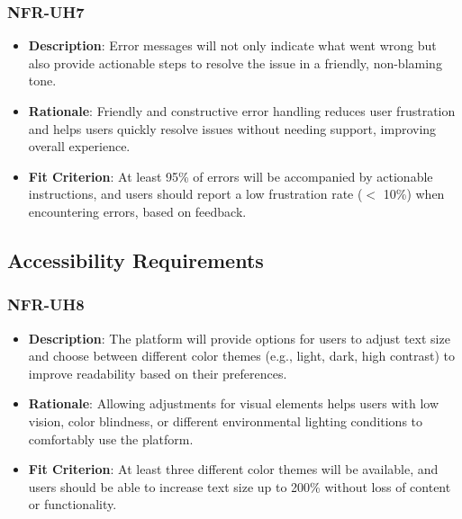 \documentclass[12pt]{article}
\begin{document}
        \subsubsection*{NFR-UH7} 
        \begin{itemize} 
            \item \textbf{Description}: Error messages will not only indicate what went wrong but also provide actionable steps to resolve the issue in a friendly, non-blaming tone.  
            \item \textbf{Rationale}: Friendly and constructive error handling reduces user frustration and helps users quickly resolve issues without needing support, improving overall experience.  
            \item \textbf{Fit Criterion}: At least 95\% of errors will be accompanied by actionable instructions, and users should report a low frustration rate ($<$ 10\%) when encountering errors, based on feedback.
        \end{itemize}


\subsection{Accessibility Requirements}


\subsubsection*{NFR-UH8} 
        \begin{itemize} 
            \item \textbf{Description}: The platform will provide options for users to adjust text size and choose between different color themes (e.g., light, dark, high contrast) to improve readability based on their preferences.  
            \item \textbf{Rationale}: Allowing adjustments for visual elements helps users with low vision, color blindness, or different environmental lighting conditions to comfortably use the platform.  
            \item \textbf{Fit Criterion}: At least three different color themes will be available, and users should be able to increase text size up to 200\% without loss of content or functionality.
        \end{itemize}
\end{document}
